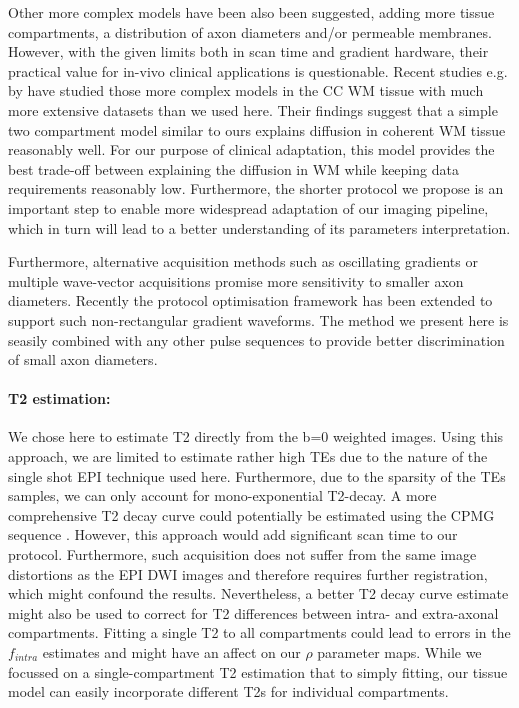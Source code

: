 Other more complex models have been also been suggested, adding more tissue compartments, a distribution of axon diameters and/or permeable membranes. However, with the given limits both in scan time and gradient hardware, their practical value for in-vivo clinical applications is questionable. Recent studies e.g. by \citet{Panagiotaki:2012, Ferizi:2012} have studied those more complex models in the CC WM tissue with much more extensive datasets than we used here. Their findings suggest that a simple two compartment model similar to ours explains diffusion in coherent WM tissue reasonably well. For our purpose of clinical adaptation, this model provides the best trade-off between explaining the diffusion in WM while keeping data requirements reasonably low. Furthermore, the shorter protocol we propose is an important step to enable more widespread adaptation of our imaging pipeline, which in turn will lead to a better understanding of its parameters interpretation.


Furthermore, alternative acquisition methods such as oscillating gradients \citep{Does:2003, Colvin:2008} or multiple wave-vector acquisitions \citep{Komlosh:2008,Koch:2008,Avram:2012} promise more sensitivity to smaller axon diameters. Recently the protocol optimisation framework has been extended to support such non-rectangular gradient waveforms\citet{Drobnjak:2010,Siow:2012a}. The method we present here is seasily combined with any other pulse sequences to provide better discrimination of small axon diameters.

\paragraph{T2 estimation: } We chose here to estimate T2 directly from the b=0 weighted images. Using this approach, we are limited to estimate rather high \glspl{TE} due to the nature of the single shot EPI technique used here. Furthermore, due to the sparsity of the \glspl{TE} samples, we can only account for mono-exponential T2-decay. A more comprehensive T2 decay curve could potentially be estimated using the \gls{CPMG} sequence \citep{Pell:2006}. However, this approach would add significant scan time to our protocol. Furthermore, such acquisition does not suffer from the same image distortions as the EPI DWI images and therefore requires further registration, which might confound the results. Nevertheless, a better T2 decay curve estimate might also be used to correct for T2 differences between intra- and extra-axonal compartments. Fitting a single T2 to all compartments could lead to errors in  the $f_{intra}$ estimates and might have an affect on our $\rho$ parameter maps. While we focussed on a single-compartment T2 estimation that to simply fitting, our tissue model can easily incorporate different T2s for individual compartments. 

